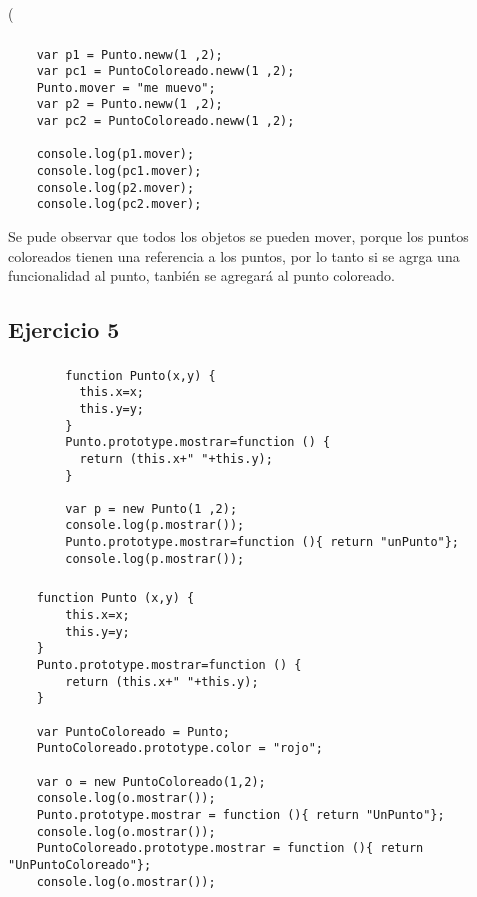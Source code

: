 \left( \documentclass[10pt,a4paper]{article}
\begin{document}
\subsubsection{}
    \begin{lstlisting}
    var p1 = Punto.neww(1 ,2);
    var pc1 = PuntoColoreado.neww(1 ,2);
    Punto.mover = "me muevo";
    var p2 = Punto.neww(1 ,2);
    var pc2 = PuntoColoreado.neww(1 ,2);

    console.log(p1.mover);
    console.log(pc1.mover);
    console.log(p2.mover);
    console.log(pc2.mover);
    \end{lstlisting}
    Se pude observar que todos los objetos se pueden mover, porque los puntos coloreados tienen una referencia a los puntos, por lo tanto si se agrga una funcionalidad al punto, tanbién se agregará al punto coloreado.
    
\subsection{Ejercicio 5}
\subsubsection{}
    \begin{lstlisting}
        function Punto(x,y) {
          this.x=x;
          this.y=y;
        }
        Punto.prototype.mostrar=function () {
          return (this.x+" "+this.y);
        }

        var p = new Punto(1 ,2);
        console.log(p.mostrar());
        Punto.prototype.mostrar=function (){ return "unPunto"};
        console.log(p.mostrar());
    \end{lstlisting}    
\subsubsection{}
    \begin{lstlisting}
    function Punto (x,y) {
    	this.x=x;
    	this.y=y;
    }
    Punto.prototype.mostrar=function () {
    	return (this.x+" "+this.y);
    }
    
    var PuntoColoreado = Punto;
    PuntoColoreado.prototype.color = "rojo";

    var o = new PuntoColoreado(1,2);
    console.log(o.mostrar());
    Punto.prototype.mostrar = function (){ return "UnPunto"};
    console.log(o.mostrar());
    PuntoColoreado.prototype.mostrar = function (){ return "UnPuntoColoreado"};
    console.log(o.mostrar());
    \end{lstlisting}
\end{document}
